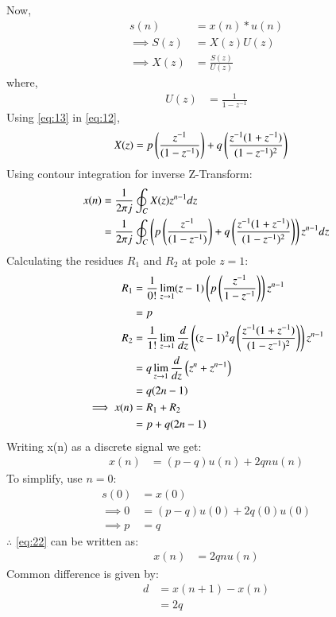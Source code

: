 \documentclass[journal,12pt,twocolumn]{IEEEtran}
\theoremstyle{remark}
\begin{document}
Now, 
\begin{align}
    s(n) &= x(n) \ast u(n)\\
    \implies S(z) &= X(z)U(z)\\
    \implies X(z) &= \frac{S(z)}{U(z)}\label{eq:12}
\end{align}
where,
\begin{align}
    U(z) &= \frac{1}{1 - z^{-1}}\label{eq:13}
\end{align}
Using \eqref{eq:13} in \eqref{eq:12},
\begin{align}
    X(z) &= p\left(\frac{z^{-1}}{(1-z^{-1})}\right) + q\left(\frac{z^{-1}(1 + z^{-1})}{(1-z^{-1})^2}\right)
\end{align}
Using contour integration for inverse Z-Transform:
\begin{align}
    x(n) &= \frac{1}{2\pi j} \oint_C X(z) z^{n-1}dz\\
    &= \frac{1}{2 \pi j} \oint_C  \left(p\left(\frac{z^{-1}}{(1-z^{-1})}\right) + q\left(\frac{z^{-1}(1 + z^{-1})}{(1-z^{-1})^2}\right)\right)z^{n-1}dz
\end{align}
Calculating the residues $R_1$ and $R_2$ at pole $z=1$:
\begin{align}
    R_1 &= \frac{1}{0!} \lim_{z \to 1}(z-1)\left(p\left(\frac{z^{-1}}{1-z^{-1}}\right)\right)z^{n-1}\\
    &= p\\
    R_2 &= \frac{1}{1!} \lim_{z \to 1}\frac{d}{dz}\left((z-1)^2q\left(\frac{z^{-1}(1 + z^{-1})}{(1-z^{-1})^2}\right)\right)z^{n-1}\\
    &= q\lim_{z \to 1}\frac{d}{dz}\left(z^{n} + z^{n-1}\right)\\
    &= q(2n-1)\\
    \implies x(n) &= R_1 + R_2\\
    &= p + q(2n-1)
\end{align}
Writing x(n) as a discrete signal we get:
\begin{align}
    x(n) &= (p-q)u(n) + 2qnu(n)\label{eq:22}
\end{align}
To simplify, use $n=0$:
\begin{align}
    s(0)&=x(0)\\
    \implies 0 &= (p-q)u(0) +2q(0)u(0)\\
    \implies p &= q
\end{align}
$\therefore$ \eqref{eq:22} can be written as:
\begin{align}
    x(n) &= 2qnu(n)
\end{align}
Common difference is given by:
\begin{align}
    d &= x(n+1) - x(n)\\
    &= 2q
\end{align}
\end{document}
